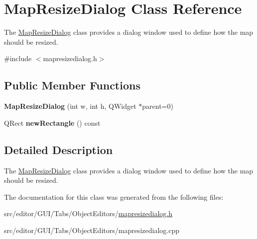 \hypertarget{class_map_resize_dialog}{\section{\-Map\-Resize\-Dialog \-Class \-Reference}
\label{class_map_resize_dialog}
}


\-The \hyperlink{class_map_resize_dialog}{\-Map\-Resize\-Dialog} class provides a dialog window used to define how the map should be resized.  




{\ttfamily \#include $<$mapresizedialog.\-h$>$}

\subsection*{\-Public \-Member \-Functions}
\begin{DoxyCompactItemize}
\item 
\hypertarget{class_map_resize_dialog_a94fbe6945fc72c26fa0df04b5056e80c}{{\bfseries \-Map\-Resize\-Dialog} (int w, int h, \-Q\-Widget $\ast$parent=0)}\label{class_map_resize_dialog_a94fbe6945fc72c26fa0df04b5056e80c}

\item 
\hypertarget{class_map_resize_dialog_a32aca851ef0379a628d6d8701f6d9342}{\-Q\-Rect {\bfseries new\-Rectangle} () const }\label{class_map_resize_dialog_a32aca851ef0379a628d6d8701f6d9342}

\end{DoxyCompactItemize}


\subsection{\-Detailed \-Description}
\-The \hyperlink{class_map_resize_dialog}{\-Map\-Resize\-Dialog} class provides a dialog window used to define how the map should be resized. 

\-The documentation for this class was generated from the following files\-:\begin{DoxyCompactItemize}
\item 
src/editor/\-G\-U\-I/\-Tabs/\-Object\-Editors/\hyperlink{mapresizedialog_8h}{mapresizedialog.\-h}\item 
src/editor/\-G\-U\-I/\-Tabs/\-Object\-Editors/mapresizedialog.\-cpp\end{DoxyCompactItemize}
